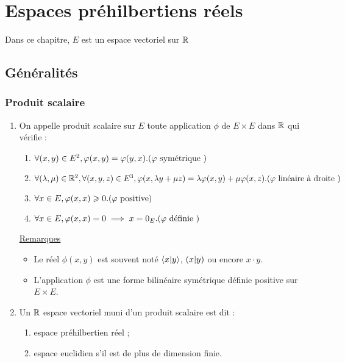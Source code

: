 \chapter{Espaces préhilbertiens réels}
\minitoc
Dans ce chapitre, \(E\) est un espace vectoriel sur \(\mathbb{R}\)
\section{Généralités}
\subsection{Produit scalaire}
\begin{defi}
    \begin{enumerate}
        \item On appelle produit scalaire sur \(E\) toute application \(\phi\) de \(E \times E\) dans \(\mathbb{R}\) qui vérifie :
        \begin{enumerate}
            \item \(\forall (x, y) \in E^2, \phi(x, y) = \phi(y, x). \hfill (\phi \text{ symétrique })\)
            \item \(\forall (\lambda , \mu ) \in \R^2, \forall (x, y, z) \in E^3, \phi(x, \lambda y + \mu z) = \lambda \phi (x, y) + \mu \phi (x, z). \hfill (\phi \text{ linéaire à droite })\)
            \item \(\forall x \in E, \phi(x, x) \geq 0. \hfill (\phi \text{ positive})\)
            \item \(\forall x \in E, \phi(x, x) = 0 \imp x = 0_E . \hfill (\phi \text{ définie })\)
        \end{enumerate}
        \underline{Remarques}\\
        \begin{itemize}
            \item Le réel \(\phi(x, y)\) est souvent noté \(\langle x | y \rangle\), \(\left(x | y\right)\) ou encore \(x \cdot y\).
            \item L’application \(\phi\) est une forme bilinéaire symétrique définie positive sur \(E \times E\).
        \end{itemize}
        \item Un \(\mathbb{R}\) espace vectoriel muni d’un produit scalaire est dit :
        \begin{enumerate}
            \item espace préhilbertien réel ;
            \item espace euclidien s’il est de plus de dimension finie.
        \end{enumerate}
    \end{enumerate}
\end{defi}
